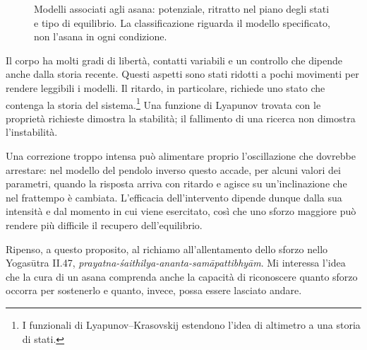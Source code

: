 \documentclass[11pt,a4paper,twoside=false,headinclude,footinclude]{scrartcl}
\newcommand{\pittUrdhva}[1][]{%
  \begin{scope}[#1]
    \draw[corpo] (-0.14,0) -- (0.02,0);
    \draw[corpo] (0,0) -- (0.10,0.78);
    \draw[corpo] (0.10,0.78) .. controls (0.30,1.10) and (0.62,1.16) .. (0.86,1.02);
    \draw[corpo] (0.86,1.02) -- (1.22,0.58) -- (1.26,0) -- (1.48,0);
    \fill[testa] (0.24,0.55) circle (0.14);
  \end{scope}}
\begin{document}
\begin{figure}[htbp]
{%
}
\caption{Modelli associati agli asana: potenziale, ritratto nel piano degli stati e tipo di equilibrio. La classificazione riguarda il modello specificato, non l’asana in ogni condizione.}
\label{fig:riepilogo}
\end{figure}

Il corpo ha molti gradi di libertà, contatti variabili e un controllo che dipende anche dalla storia recente. Questi aspetti sono stati ridotti a pochi movimenti per rendere leggibili i modelli. Il ritardo, in particolare, richiede uno stato che contenga la storia del sistema.\footnote{I funzionali di Lyapunov--Krasovskij estendono l'idea di altimetro a una storia di stati.} Una funzione di Lyapunov trovata con le proprietà richieste dimostra la stabilità; il fallimento di una ricerca non dimostra l'instabilità.

Una correzione troppo intensa può alimentare proprio l'oscillazione che dovrebbe arrestare: nel modello del pendolo inverso questo accade, per alcuni valori dei parametri, quando la risposta arriva con ritardo e agisce su un'inclinazione che nel frattempo è cambiata. L'efficacia dell'intervento dipende dunque dalla sua intensità e dal momento in cui viene esercitato, così che uno sforzo maggiore può rendere più difficile il recupero dell'equilibrio.

Ripenso, a questo proposito, al richiamo all'allentamento dello sforzo nello Yogasūtra II.47, \emph{prayatna-śaithilya-ananta-samāpattibhyām}. Mi interessa l'idea che la cura di un asana comprenda anche la capacità di riconoscere quanto sforzo occorra per sostenerlo e quanto, invece, possa essere lasciato andare.
\end{document}
